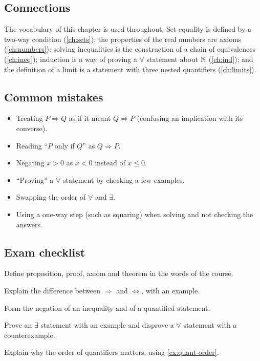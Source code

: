 \subsection*{Connections}
The vocabulary of this chapter is used throughout. Set equality is defined by a two-way condition
(\cref{ch:sets}); the properties of the real numbers are axioms (\cref{ch:numbers}); solving
inequalities is the construction of a chain of equivalences (\cref{ch:ineq}); induction is a way of
proving a $\forall$ statement about $\mathbb{N}$ (\cref{ch:ind}); and the definition of a limit is a statement
with three nested quantifiers (\cref{ch:limits}).

\subsection*{Common mistakes}
\begin{itemize}
  \item Treating $P\Rightarrow Q$ as if it meant $Q\Rightarrow P$ (confusing an implication with its converse).
  \item Reading ``$P$ only if $Q$'' as $Q\Rightarrow P$.
  \item Negating $x>0$ as $x<0$ instead of $x\le 0$.
  \item ``Proving'' a $\forall$ statement by checking a few examples.
  \item Swapping the order of $\forall$ and $\exists$.
  \item Using a one-way step (such as squaring) when solving and not checking the answers.
\end{itemize}

\subsection*{Exam checklist}
\begin{checklist}
  \item Define proposition, proof, axiom and theorem in the words of the course.
  \item Explain the difference between $\Rightarrow$ and $\Leftrightarrow$, with an example.
  \item Form the negation of an inequality and of a quantified statement.
  \item Prove an $\exists$ statement with an example and disprove a $\forall$ statement with a counterexample.
  \item Explain why the order of quantifiers matters, using \cref{ex:quant-order}.
\end{checklist}

